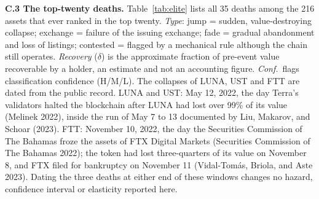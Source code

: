 \documentclass[11pt]{article}
\begin{document}
\textbf{C.3 The top-twenty deaths.} Table~\ref{tab:elite} lists all 35 deaths among the 216 assets that ever ranked in the top twenty. \emph{Type}: jump = sudden, value-destroying collapse; exchange = failure of the issuing exchange; fade = gradual abandonment and loss of listings; contested = flagged by a mechanical rule although the chain still operates. \emph{Recovery} ($\delta$) is the approximate fraction of pre-event value recoverable by a holder, an estimate and not an accounting figure. \emph{Conf.}\ flags classification confidence (H/M/L). The collapses of LUNA, UST and FTT are dated from the public record. LUNA and UST: May 12, 2022, the day Terra's validators halted the blockchain after LUNA had lost over 99\% of its value (Melinek 2022), inside the run of May 7 to 13 documented by Liu, Makarov, and Schoar (2023). FTT: November 10, 2022, the day the Securities Commission of The Bahamas froze the assets of FTX Digital Markets (Securities Commission of The Bahamas 2022); the token had lost three-quarters of its value on November 8, and FTX filed for bankruptcy on November 11 (Vidal-Tom\'as, Briola, and Aste 2023). Dating the three deaths at either end of these windows changes no hazard, confidence interval or elasticity reported here.
\end{document}
